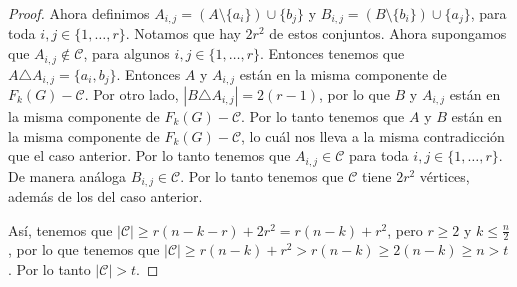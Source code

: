\begin{proof}
Ahora definimos $A_{i,j} = (A\setminus \{a_i\}) \cup \{b_j\}$ y $B_{i,j} =
(B\setminus \{b_i\}) \cup \{a_j\}$, para toda $ i, j \in \{1, \dots, r\}$.
Notamos que hay $2r^2$ de estos conjuntos. Ahora supongamos que $A_{i,j} \notin
\mathcal{C}$, para algunos $ i, j \in \{1, \dots, r\}$. Entonces tenemos que $A
\triangle A_{i,j} = \{a_i, b_j\}$. Entonces $A$ y $A_{i,j}$ est\'an en la misma
componente de $F_k(G)- \mathcal{C}$. Por otro lado, $|B \triangle A_{i,j}| = 2
(r-1)$, por lo que $B$ y $A_{i,j}$ est\'an en la misma componente de $F_k(G) -
\mathcal{C}$. Por lo tanto tenemos que $A$ y $B$ est\'an en la misma componente
de $F_k(G)-\mathcal{C}$, lo cu\'al nos lleva a la misma contradicci\'on que el
caso anterior. Por lo tanto tenemos que $A_{i,j} \in \mathcal{C}$ para toda $i,
j \in \{1, \dots, r\}$. De manera an\'aloga $B_{i,j} \in \mathcal{C}$. Por lo
tanto tenemos que $\mathcal{C}$ tiene $2r^2$ v\'ertices, adem\'as de los del
caso anterior.

As\'i, tenemos que $|\mathcal{C}|\geq r(n-k-r)+2r^2 = r(n-k) + r^2$, pero $r
\geq 2$ y $k \leq \frac{n}{2}$, por lo que tenemos que $|\mathcal{C}| \geq
r(n-k)+r^2 > r(n-k) \geq 2(n-k) \geq n >t$. Por lo tanto $|\mathcal{C}|>t$.
\end{proof} 
